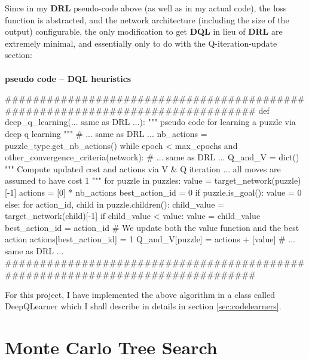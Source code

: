 Since in my \textbf{DRL} pseudo-code above (as well as in my actual code), the loss function is abstracted, and the network architecture (including the size of the output) configurable, the only modification to get \textbf{DQL} in lieu of \textbf{DRL} are extremely minimal, and essentially only to do with the Q-iteration-update section:


\teal
\paragraph{}{\textbf{pseudo code -- \textbf{DQL} heuristics}}
\begin{pseudocode}
###############################################################################
def deep_q_learning(... same as DRL ...):
    """ pseudo code for learning a puzzle via deep q learning """
    # ... same as DRL ...
    nb_actions = puzzle_type.get_nb_actions()
    while epoch < max_epochs and other_convergence_criteria(network):
        # ... same as DRL ...
        Q_and_V = dict()
        """ Compute updated cost and actions via V & Q iteration ... 
             all moves are assumed to have cost 1 """
        for puzzle in puzzles:
            value = target_network(puzzle)[-1]
            actions = [0] * nb_actions
            best_action_id = 0
            if puzzle.is_goal():
                value = 0
            else:
                for action_id, child in puzzle.children():
                    child_value = target_network(child)[-1]
                    if child_value < value:
                        value = child_value
                        best_action_id = action_id
            # We update both the value function and the best action
            actions[best_action_id] = 1
            Q_and_V[puzzle] = actions + [value]
        # ... same as DRL ...
###############################################################################
\end{pseudocode}
\black


For this project, I have implemented the above algorithm in a class called DeepQLearner which I shall describe in details in section \ref{sec:codelearners}.


\section{Monte Carlo Tree Search}


